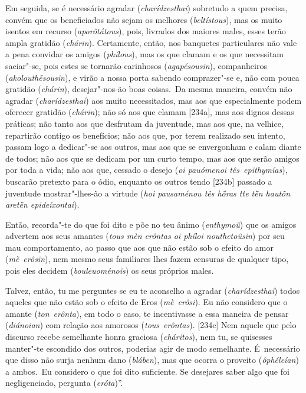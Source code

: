 Em seguida, se é necessário agradar (\emph{charídzesthai}) sobretudo a
quem precisa, convém que os beneficiados não sejam os melhores
(\emph{beltístous}), mas os muito isentos em recurso
(\emph{aporôtátous}), pois, livrados dos maiores males, esses terão
ampla gratidão (\emph{chárin}). Certamente, então, nos banquetes
particulares não vale a pena convidar os amigos (\emph{phílous}), mas os
que clamam e os que necessitam saciar"-se, pois estes se tornarão
carinhosos (\emph{agapésousin}), companheiros (\emph{akolouthḗsousin}),
e virão a nossa porta sabendo comprazer"-se e, não com pouca gratidão
(\emph{chárin}), desejar"-nos-ão boas coisas.~Da mesma maneira, convém
não agradar (\emph{charídzesthai}) aos muito necessitados, mas aos que
especialmente podem oferecer gratidão (\emph{chárin}); não só aos que
clamam [234a], mas aos dignos dessas práticas; não tanto aos que
desfrutam da juventude, mas aos que, na velhice, repartirão contigo os
benefícios; não aos que, por terem realizado seu intento, passam logo a
dedicar"-se aos outros, mas aos que se envergonham e calam diante de
todos; não aos que se dedicam por um curto tempo, mas aos que serão
amigos por toda a vida; não aos que, cessado o desejo (\emph{oi
pauómenoi tês~epithymías}), buscarão pretexto para o ódio, enquanto os
outros tendo [234b] passado a juventude mostrar"-lhes-ão a virtude
(\emph{hoì pausaménou tês hṓras tte tḕn hautõn aretḕn epideíxontai}).

Então, recorda"-te do que foi dito e põe no teu ânimo (\emph{enthymoû})
que os amigos advertem aos seus amantes (\emph{tous mèn erôntas oi
phíloi nouthetoûsin}) por seu mau comportamento, ao passo que aos que
não estão sob o efeito do amor (\emph{mḕ}~\emph{erôsin}), nem mesmo seus
familiares lhes fazem censuras de qualquer tipo, pois eles decidem
(\emph{bouleuoménois}) os seus próprios males.

Talvez, então, tu me perguntes se eu te aconselho a agradar
(\emph{charídzesthai}) todos aqueles que não estão sob o efeito de Eros
(\emph{mḕ}~\emph{erôsi}). Eu não considero que o amante
(\emph{ton}~\emph{erônta}), em todo o caso, te incentivasse a essa
maneira de pensar (\emph{diánoian}) com relação aos amorosos
(\emph{tous}~\emph{erôntas}). [234c] Nem aquele que pelo discurso
recebe semelhante honra graciosa (\emph{cháritos}), nem tu, se quisesses
manter"-te escondido dos outros, poderias agir de modo semelhante. É~necessário que disso não surja nenhum dano (\emph{bláben}), mas que
ocorra o proveito (\emph{ôphéleían}) a ambos.~Eu considero o que foi
dito suficiente. Se desejares saber algo que foi negligenciado, pergunta
(\emph{erṓta})''.

